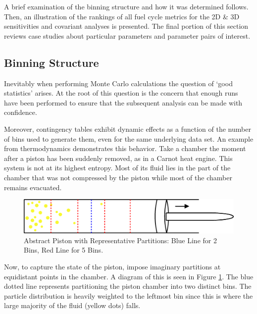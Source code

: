A brief examination of the binning structure and how it was determined follows. 
Then, an illustration of the rankings of all fuel cycle metrics for the 2D \& 3D sensitivities 
and covariant analyses is presented.  The final portion of this section reviews case studies 
about particular parameters and parameter pairs of interest.


\subsection{Binning Structure}
\label{cts_sec:binning}

Inevitably when performing Monte Carlo calculations the question of `good statistics' arises.  
At the root of this question is the concern that enough runs
have been performed to ensure that the subsequent analysis can be made with confidence. 

Moreover, contingency tables exhibit dynamic effects as a function of the number of bins used to 
generate them, even for the same underlying data set.  An example from
thermodynamics demonstrates this behavior.  Take a chamber the moment after a piston has been 
suddenly removed, as in a Carnot heat engine.
This system is not at its highest entropy.  Most of its fluid lies in the part of the chamber 
that was not compressed by the piston while most of the
chamber remains evacuated.

\begin{figure}[htbp]
\begin{center}
\includegraphics[scale=0.50]{ct_sensitivity/figs/PistonCT.eps}
\caption{Abstract Piston with Representative Partitions: Blue Line for 2 Bins, Red Line for 5 Bins.}
\label{piston_ct}
\end{center}
\end{figure}

Now, to capture the state of the piston, impose imaginary partitions at equidistant points in the 
chamber.  A diagram of this is seen in Figure \ref{piston_ct}.  The blue
dotted line represents partitioning the piston chamber into two distinct bins.  The particle 
distribution is heavily weighted to the leftmost bin
since this is where the large majority of the fluid (yellow dots) falls.  

